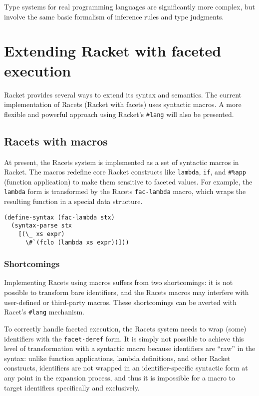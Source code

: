 \documentclass{article}
\begin{document}
Type systems for real programming languages are significantly more complex, but involve the same basic formalism of inference rules and type judgments.



\section{Extending Racket with faceted execution}
Racket provides several ways to extend its syntax and semantics. The current implementation of Racets (Racket with facets) uses syntactic macros. A more flexible and powerful approach using Racket's \texttt{\#lang} will also be presented.

\subsection{Racets with macros}
At present, the Racets system is implemented as a set of syntactic macros in Racket. The macros redefine core Racket constructs like \texttt{lambda}, \texttt{if}, and \texttt{\#\%app} (function application) to make them sensitive to faceted values. For example, the \texttt{lambda} form is transformed by the Racets \texttt{fac-lambda} macro, which wraps the resulting function in a special data structure.

\begin{lstlisting}
(define-syntax (fac-lambda stx)
  (syntax-parse stx
    [(\_ xs expr)
      \#`(fclo (lambda xs expr))]))
\end{lstlisting}

\subsubsection{Shortcomings}
Implementing Racets using macros suffers from two shortcomings: it is not possible to transform bare identifiers, and the Racets macros may interfere with user-defined or third-party macros. These shortcomings can be averted with Racet's \texttt{\#lang} mechanism.

To correctly handle faceted execution, the Racets system needs to wrap (some) identifiers with the \texttt{facet-deref} form. It is simply not possible to achieve this level of transformation with a syntactic macro because identifiers are ``raw'' in the syntax: unlike function applications, lambda definitions, and other Racket constructs, identifiers are not wrapped in an identifier-specific syntactic form at any point in the expansion process, and thus it is impossible for a macro to target identifiers specifically and exclusively.
\end{document}
